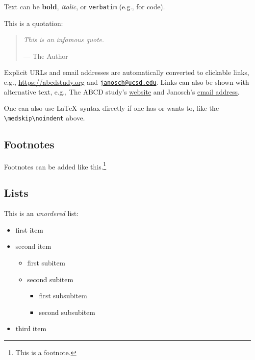 \documentclass{article}
\begin{document}
Text can be \textbf{bold}, \emph{italic}, or \texttt{verbatim} (e.g., for code).

\medskip\noindent This is a quotation:

\begin{quote}
\emph{This is an infamous quote.}

\smallskip\sffamily\footnotesize --- The Author
\end{quote}

\medskip\noindent Explicit URLs and email addresses are automatically converted to clickable links, e.g., \url{https://abcdstudy.org} and \href{mailto:janosch@ucsd.edu}{\nolinkurl{janosch@ucsd.edu}}. Links can also be shown with alternative text, e.g., The ABCD study's \href{https://abcdstudy.org}{website} and Janosch's \href{mailto:janosch@ucsd.edu}{email address}.

One can also use \LaTeX~syntax directly if one has or wants to, like the \texttt{\textbackslash{}medskip\textbackslash{}noindent} above.

\hypertarget{footnotes}{%
\subsection{Footnotes}\label{footnotes}}

Footnotes can be added like this.\footnote{This is a footnote.}

\hypertarget{lists}{%
\subsection{Lists}\label{lists}}

This is an \emph{unordered} list:

\begin{itemize}
\tightlist
\item
  first item
\item
  second item

  \begin{itemize}
  \tightlist
  \item
    first subitem
  \item
    second subitem

    \begin{itemize}
    \tightlist
    \item
      first subsubitem
    \item
      second subsubitem
    \end{itemize}
  \end{itemize}
\item
  third item
\end{itemize}
\end{document}
